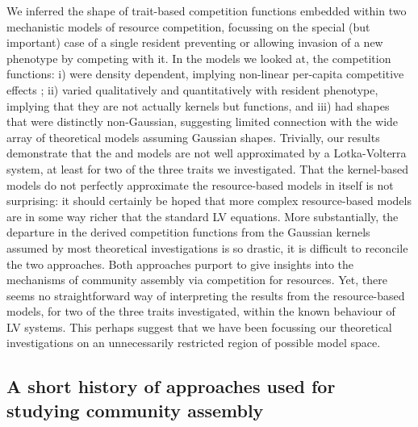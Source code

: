 \documentclass[a4paper,11pt]{article}
\begin{document}
We inferred the shape of trait-based competition functions embedded within
two mechanistic models of resource competition, focussing on the special (but
important) case of a single resident preventing or allowing invasion of a new
phenotype by competing with it. In the models we looked at, the competition
functions: i) were density dependent, implying non-linear per-capita
competitive effects \citep{Abrams-1980}; ii) varied qualitatively and
quantitatively with resident phenotype, implying that they are not actually
kernels but functions, and iii) had shapes that were distinctly non-Gaussian,
suggesting limited connection with the wide array of theoretical models
assuming Gaussian shapes. Trivially, our results demonstrate that the \Rstar
and \plant  models are not well approximated by a Lotka-Volterra system, at
least for two of the three traits we investigated. That the kernel-based models
do not perfectly approximate the resource-based models in itself  is not
surprising: it should certainly be hoped that more complex resource-based models
are in some way richer that the standard LV equations. More substantially, the
departure in the derived competition functions from the Gaussian kernels
assumed by most theoretical investigations is so drastic, it is difficult to
reconcile the two approaches. Both approaches
purport to give insights into the mechanisms
of community assembly via competition for resources. Yet, there seems no
straightforward way of interpreting the results from the resource-based
models, for two of the three traits investigated, within the known behaviour
of LV systems. This perhaps suggest that we have been focussing our
theoretical investigations on an unnecessarily restricted region of possible
model space.

\subsection{A short history of approaches used for studying community assembly}
\end{document}
